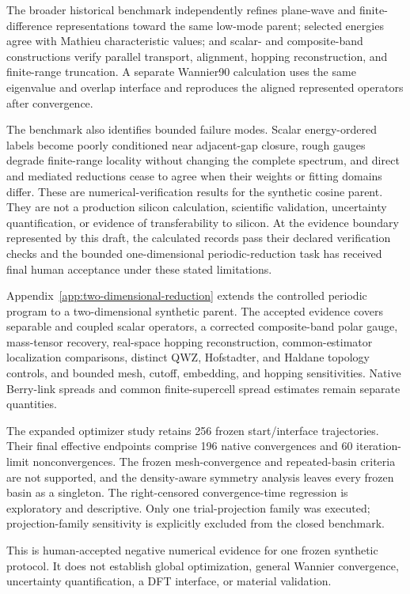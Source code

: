 The broader historical benchmark independently refines plane-wave and finite-difference
representations toward the same low-mode parent; selected energies agree with Mathieu
characteristic values; and scalar- and composite-band constructions verify parallel
transport, alignment, hopping reconstruction, and finite-range truncation. A separate Wannier90 calculation
uses the same eigenvalue and overlap interface and reproduces the aligned
represented operators after convergence.

The benchmark also identifies bounded failure modes. Scalar energy-ordered
labels become poorly conditioned near adjacent-gap closure, rough gauges degrade
finite-range locality without changing the complete spectrum, and direct and
mediated reductions cease to agree when their weights or fitting domains differ.
These are numerical-verification results for the synthetic cosine parent. They
are not a production silicon calculation, scientific validation, uncertainty
quantification, or evidence of transferability to silicon. At the evidence
boundary represented by this draft, the calculated records pass their declared
verification checks and the bounded one-dimensional periodic-reduction task has
received final human acceptance under these stated limitations.

Appendix~\ref{app:two-dimensional-reduction} extends the controlled periodic
program to a two-dimensional synthetic parent. The accepted evidence covers
separable and coupled scalar operators, a corrected composite-band polar gauge,
mass-tensor recovery, real-space hopping reconstruction, common-estimator
localization comparisons, distinct QWZ, Hofstadter, and Haldane topology
controls, and bounded mesh, cutoff, embedding, and hopping sensitivities.
Native Berry-link spreads and common finite-supercell spread estimates remain
separate quantities.

The expanded optimizer study retains 256 frozen start/interface trajectories.
Their final effective endpoints comprise 196 native convergences and 60
iteration-limit nonconvergences. The frozen mesh-convergence and repeated-basin
criteria are not supported, and the density-aware symmetry analysis leaves
every frozen basin as a singleton. The right-censored convergence-time
regression is exploratory and descriptive. Only one trial-projection family
was executed; projection-family sensitivity is explicitly excluded from the
closed benchmark.

This is human-accepted negative numerical evidence for one frozen synthetic
protocol. It does not establish global optimization, general Wannier
convergence, uncertainty quantification, a DFT interface, or material
validation.

